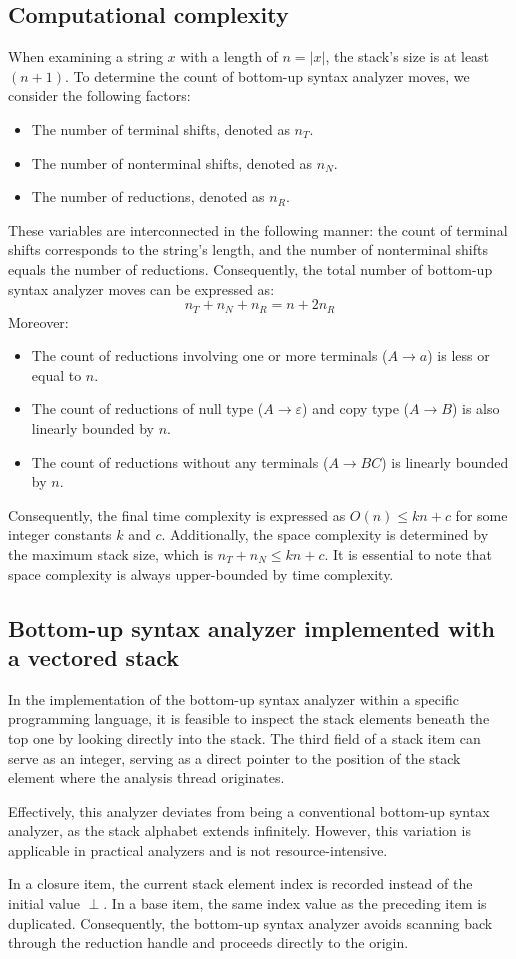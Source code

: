 \subsection{Computational complexity}
When examining a string $x$ with a length of $n = \left\lvert x \right\rvert $, the stack's size is at least $(n + 1)$. 
To determine the count of bottom-up syntax analyzer moves, we consider the following factors:
\begin{itemize}
    \item The number of terminal shifts, denoted as $n_T$.
    \item The number of nonterminal shifts, denoted as $n_N$.
    \item The number of reductions, denoted as $n_R$.
\end{itemize}
These variables are interconnected in the following manner: the count of terminal shifts corresponds to the string's length, and the number of nonterminal shifts equals the number of reductions. 
Consequently, the total number of bottom-up syntax analyzer moves can be expressed as:
\[n_T+n_N+n_R=n+2n_R\]
Moreover:
\begin{itemize}
    \item The count of reductions involving one or more terminals ($A \rightarrow a$) is less or equal to $n$. 
    \item The count of reductions of null type ($A \rightarrow \varepsilon$) and copy type ($A \rightarrow B$) is also linearly bounded by $n$.
    \item The count of reductions without any terminals ($A \rightarrow BC$) is linearly bounded by $n$.
\end{itemize}
Consequently, the final time complexity is expressed as $O(n) \leq kn + c$ for some integer constants $k$ and $c$. 
Additionally, the space complexity is determined by the maximum stack size, which is $n_T + n_N \leq kn + c$. 
It is essential to note that space complexity is always upper-bounded by time complexity.

\subsection{Bottom-up syntax analyzer implemented with a vectored stack}
In the implementation of the bottom-up syntax analyzer within a specific programming language, it is feasible to inspect the stack elements beneath the top one by looking directly into the stack.
The third field of a stack item can serve as an integer, serving as a direct pointer to the position of the stack element where the analysis thread originates.

Effectively, this analyzer deviates from being a conventional bottom-up syntax analyzer, as the stack alphabet extends infinitely.
However, this variation is applicable in practical analyzers and is not resource-intensive.

In a closure item, the current stack element index is recorded instead of the initial value $\perp$.
In a base item, the same index value as the preceding item is duplicated. 
Consequently, the bottom-up syntax analyzer avoids scanning back through the reduction handle and proceeds directly to the origin.